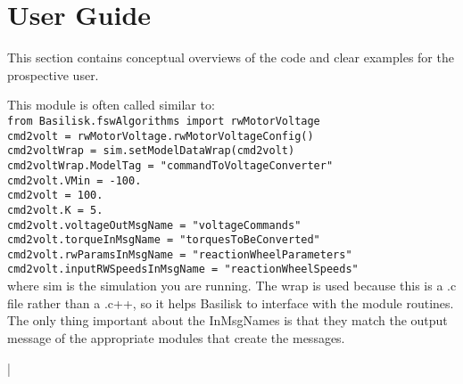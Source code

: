 \section{User Guide}
This section contains conceptual overviews of the code and clear examples for the prospective user. 

This module is often called similar to:\\
\verb|from Basilisk.fswAlgorithms import rwMotorVoltage|\\
\verb|cmd2volt = rwMotorVoltage.rwMotorVoltageConfig()|\\
\verb|cmd2voltWrap = sim.setModelDataWrap(cmd2volt)|\\
\verb|cmd2voltWrap.ModelTag = "commandToVoltageConverter"|\\
\verb|cmd2volt.VMin = -100.|\\
\verb|cmd2volt = 100.|\\
\verb|cmd2volt.K = 5.|\\
\verb|cmd2volt.voltageOutMsgName = "voltageCommands"|\\
\verb|cmd2volt.torqueInMsgName = "torquesToBeConverted"|\\
\verb|cmd2volt.rwParamsInMsgName = "reactionWheelParameters"|\\
\verb|cmd2volt.inputRWSpeedsInMsgName = "reactionWheelSpeeds"|\\

where sim is the simulation you are running. The wrap is used because this is a .c file rather than a .c++, so it helps Basilisk to interface with the module routines. The only thing important about the InMsgNames is that they match the output message of the appropriate modules that create the messages.


|
